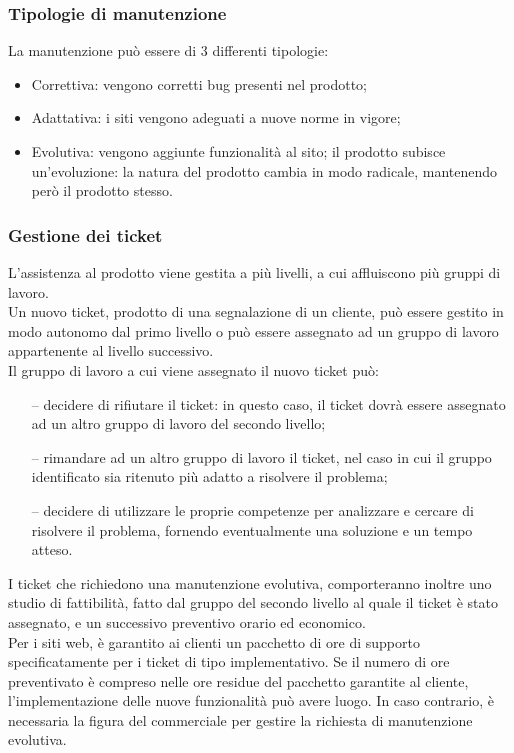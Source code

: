 		\subsubsection{Tipologie di manutenzione}
			La manutenzione può essere di 3 differenti tipologie:
			\begin{itemize}
				\item{Correttiva: vengono corretti bug presenti nel prodotto;}
				\item{Adattativa: i siti vengono adeguati a nuove norme in vigore;}
				\item{Evolutiva: vengono aggiunte funzionalità al sito; il prodotto subisce un'evoluzione: la natura del prodotto cambia in modo radicale, mantenendo però il prodotto stesso.}
			\end{itemize}

		\subsubsection{Gestione dei ticket}
		L'assistenza al prodotto viene gestita a più livelli, a cui affluiscono più gruppi di lavoro. \\
		Un nuovo ticket, prodotto di una segnalazione di un cliente, può essere gestito in modo autonomo dal primo livello o può essere assegnato ad un gruppo di lavoro appartenente al livello successivo. \\
		Il gruppo di lavoro a cui viene assegnato il nuovo ticket può:
		\begin{itemize}
			\item[--] {decidere di rifiutare il ticket: in questo caso, il ticket dovrà essere assegnato ad un altro gruppo di lavoro del secondo livello;}
			\item[--] {rimandare ad un altro gruppo di lavoro il ticket, nel caso in cui il gruppo identificato sia ritenuto più adatto a risolvere il problema;}
			\item[--] {decidere di utilizzare le proprie competenze per analizzare e cercare di risolvere il problema, fornendo eventualmente una soluzione e un tempo atteso.}
		\end{itemize}
	
		I ticket che richiedono una manutenzione evolutiva, comporteranno inoltre uno studio di fattibilità, fatto dal gruppo del secondo livello al quale il ticket è stato assegnato, e un successivo preventivo orario ed economico. \\
		Per i siti web, è garantito ai clienti un pacchetto di ore di supporto specificatamente per i ticket di tipo implementativo. Se il numero di ore preventivato è compreso nelle ore residue del pacchetto garantite al cliente, l'implementazione delle nuove funzionalità può avere luogo. In caso contrario, è necessaria la figura del commerciale per gestire la richiesta di manutenzione evolutiva.

